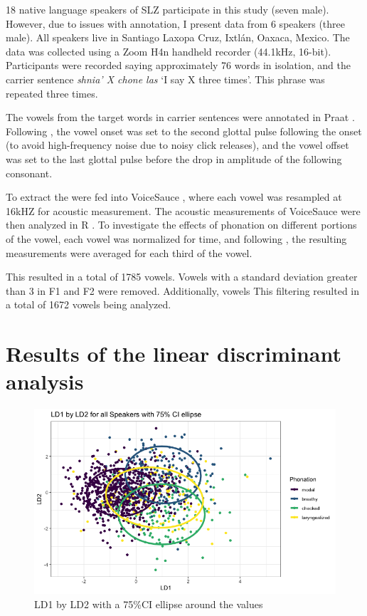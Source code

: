 \documentclass[12pt, letterpaper]{article}
\begin{document}
18 native language speakers of SLZ participate in this study (seven male). However, due to issues with annotation, I present data from 6 speakers (three male). All speakers live in Santiago Laxopa Cruz, Ixtlán, Oaxaca, Mexico. The data was collected using a Zoom H4n handheld recorder (44.1kHz, 16-bit). Participants were recorded saying approximately 76 words in isolation, and the carrier sentence \textit{shnia' X chone las} `I say X three times'. This phrase was repeated three times. 

The vowels from the target words in carrier sentences were annotated in Praat \citep{boersmaPraatDoingPhonetics2021}. Following \citet{garellekAcousticDiscriminabilityComplex2020}, the vowel onset was set to the second glottal pulse following the onset (to avoid high-frequency noise due to noisy click releases), and the vowel offset was set to the last glottal pulse before the drop in amplitude of the following consonant. 

To extract the were fed into VoiceSauce \citep{shueVOICESAUCEProgramVoice2009}, where each vowel was resampled at 16kHZ for acoustic measurement. The acoustic measurements of VoiceSauce were then analyzed in R \citep{rcoreteamLanguageEnvironmentStatistical2021}. To investigate the effects of phonation on different portions of the vowel, each vowel was normalized for time, and following \citet{garellekAcousticConsequencesPhonation2011}, the resulting measurements were averaged for each third of the vowel. 

This resulted in a total of 1785 vowels. Vowels with a standard deviation greater than 3 in F1 and F2 were removed. Additionally, vowels 
This filtering resulted in a total of 1672 vowels being analyzed.

\section{Results of the linear discriminant analysis} \label{sec:LDAResults}

\begin{figure}[!h]
		\centering
		\includegraphics[width=\linewidth]{Images/ld1xld2.png}
		\caption{LD1 by LD2 with a 75\%CI ellipse around the values}
		\label{fig:LD1LD2}
\end{figure}
\end{document}

